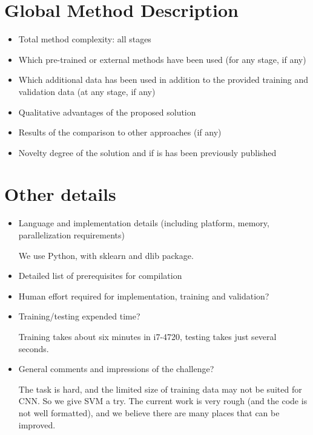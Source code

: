 \documentclass{article}
\begin{document}
\section{Global Method Description}

\begin{itemize}
\item Total method complexity: all stages
\item Which pre-trained or external methods have been used (for any stage, if any) 
\item Which additional data has been used in addition to the provided training and validation data (at any stage, if any) 
\item Qualitative advantages of the proposed solution
\item Results of the comparison to other approaches (if any)
\item Novelty degree of the solution and if is has been previously published
\end{itemize}

\section{Other details}

\begin{itemize}
\item Language and implementation details (including platform, memory, parallelization requirements)

We use Python, with sklearn and dlib package.
\item Detailed list of prerequisites for compilation
\item Human effort required for implementation, training and validation?
\item Training/testing expended time? 

Training takes about six minutes in i7-4720, testing takes just several seconds.
\item General comments and impressions of the challenge?

The task is hard, and the limited size of training data may not be suited for CNN. So we give SVM a try. The current work is very rough (and the code is not well formatted), and  we believe there are many places that can be improved.
\end{itemize}
\end{document}
